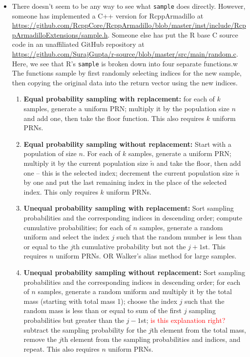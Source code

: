 \documentclass[12pt]{article}
\begin{document}
\begin{itemize}
\item There doesn't seem to be any way to see what \texttt{sample} does directly.
However, someone has implemented a C++ version for RcppArmadillo at \url{https://github.com/RcppCore/RcppArmadillo/blob/master/inst/include/RcppArmadilloExtensions/sample.h}.
Someone else has put the R base C source code in an unaffiliated GitHub repository at \url{https://github.com/SurajGupta/r-source/blob/master/src/main/random.c}.
Here, we see that R's \texttt{sample} is broken down into four separate functions.w
The functions sample by first randomly selecting indices for the new sample, then copying the original data into the return vector using the new indices.
\begin{enumerate}
\item \textbf{Equal probability sampling with replacement:} 
for each of $k$ samples, generate a uniform PRN;
multiply it by the population size $n$ and add one, then take the floor function.
This also requires $k$ uniform PRNs.
\item \textbf{Equal probability sampling without replacement:} 
Start with a population of size $n$.
For each of $k$ samples, generate a uniform PRN;
multiply it by the current population size $\tilde{n}$ and take the floor, then add one -- this is the selected index;
decrement the current population size $\tilde{n}$ by one and put the last remaining index in the place of the selected index.
This only requires $k$ uniform PRNs.
\item \textbf{Unequal probability sampling with replacement:} 
Sort sampling probabilities and the corresponding indices in descending order; 
compute cumulative probabilities; 
for each of $n$ samples, generate a random uniform and select the index $j$ such that the random number is less than or equal to the $j$th cumulative probability but not the $j+1$st.  
This requires $n$ uniform PRNs.  
OR Walker's alias method for large samples.
\item \textbf{Unequal probability sampling without replacement:} 
Sort sampling probabilities and the corresponding indices in descending order; 
for each of $n$ samples, generate a random uniform and multiply it by the total mass (starting with total mass 1);
choose the index $j$ such that the random mass is less than or equal to sum of the first $j$ sampling probabilities but greater than the $j-1$st; \textcolor{red}{is this explanation right?}
subtract the sampling probability for the $j$th element from the total mass, remove the $j$th element from the sampling probabilities and indices, and repeat.
This also requires $n$ uniform PRNs.
\end{enumerate}
\end{itemize}
\end{document}
